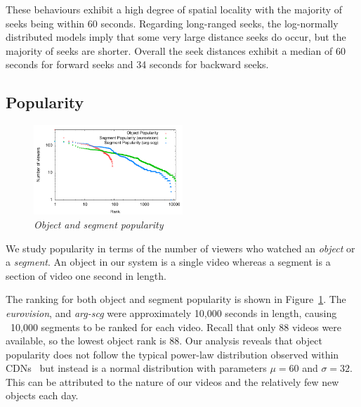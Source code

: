 \documentclass[a4paper,11pt]{article}
\newcommand{\capttext}{\protect\centering\em}
\begin{document}

These behaviours exhibit a high degree of spatial locality with the majority of seeks being within 60 seconds. Regarding long-ranged seeks, the log-normally distributed models imply that some very large distance seeks do occur, but the majority of seeks are shorter. Overall the seek distances exhibit a median of 60 seconds for forward seeks and 34 seconds for backward seeks.

\subsection{Popularity}

\begin{figure}[tbp]
    \centering
    \includegraphics[width=0.5\textwidth]{./diagrams/all_sessions_rank}
    \caption{\capttext Object and segment popularity}
    \label{fig:popularity_object_rank}
\end{figure}

We study popularity in terms of the number of viewers who watched an \emph{object} or a \emph{segment}. An object in our system is a single video whereas a segment is a section of video one second in length.

The ranking for both object and segment popularity is shown in Figure~\ref{fig:popularity_object_rank}. The \emph{eurovision}, and \emph{arg-scg} were approximately 10,000 seconds in length, causing ~10,000 segments to be ranked for each video. Recall that only 88 videos were available, so the lowest object rank is 88. Our analysis reveals that object popularity does not follow the typical power-law distribution observed within CDNs~\cite{Chesire01Measurement,Almeida01Analysis,yu2006uub} but instead is a normal distribution with parameters $\mu = 60$ and $\sigma = 32$. This can be attributed to the nature of our videos and the relatively few new objects each day.

\end{document}
